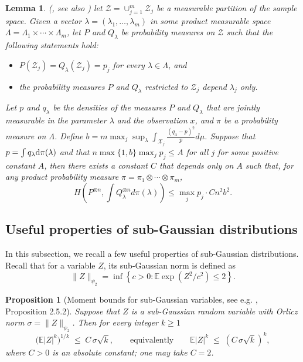 \documentclass{article}
\newcommand{\E}{\mathbb{E}}
\newcommand{\dd}{\textup{d}}
\newtheorem{lemma}{Lemma}[section]
\newtheorem{proposition}{Proposition}[section]
\begin{document}
\begin{lemma}
    \label{lemma:hellinger-bound-previous}
    (\citet[Theorem 2.1]{robins2009semiparametric}, see also \citet[Theorem 4]{jin2024structure})
    let $\mathcal{Z}=\cup_{j=1}^m \mathcal{Z}_j$ be a measurable partition of the sample space. Given a vector $\lambda=\left(\lambda_1, \ldots, \lambda_m\right)$ in some product measurable space $\Lambda=\Lambda_1 \times \cdots \times \Lambda_m$, let $P$ and $Q_{\lambda}$ be probability measures on $\mathcal{Z}$ such that the following statements hold:
    \begin{itemize}
        \item $P\left(\mathcal{Z}_j\right)=Q_\lambda\left(\mathcal{Z}_j\right)= p_j$ for every $\lambda \in \Lambda$, and
        \item the probability measures $P$ and $Q_{\lambda}$ restricted to $\mathcal{Z}_j$ depend $\lambda_j$ only.
    \end{itemize}
    
    Let $p$ and $q_{\lambda}$ be the densities of the measures $P$ and $Q_\lambda$ that are jointly measurable in the parameter $\lambda$ and the observation $x$, and $\pi$ be a probability measure on $\Lambda$. Define $b= m\max _j \sup _\lambda \int_{\mathcal{X}_j} \frac{\left(q_\lambda-p\right)^2}{p} d \mu$.
    Suppose that $p=\int q_{\lambda}\dd\pi(\lambda)$ and that $n\max\{1,b\}\max_j p_j \leq A$ for all $j$ for some positive constant $A$, then there exists a constant $C$ that depends only on $A$ such that, for any product probability measure $\pi=\pi_1 \otimes \cdots \otimes \pi_m$,
    $$
    H\left(P^{\otimes n}, \int Q_\lambda^{\otimes n} d \pi(\lambda)\right) \leq \max_j p_j\cdot Cn^2b^2.
    $$
\end{lemma}

\subsection{Useful properties of sub-Gaussian distributions}

In this subsection, we recall a few useful properties of sub-Gaussian distributions. Recall that for a variable $Z$, its sub-Gaussian norm is defined as
\begin{equation}
    \label{sub-gaussian-norm}
    \|Z\|_{\psi_2} = \inf \left\{ c>0 : \E\exp(Z^2/c^2) \leq 2\right\}.
\end{equation}

\begin{proposition}[Moment bounds for sub-Gaussian variables, see e.g. , \citet{vershynin2018high} Proposition 2.5.2]
    Suppose that $Z$ is a sub-Gaussian random variable with Orlicz norm 
    $\sigma=\|Z\|_{\psi_2}$.  Then for every integer $k\ge1$
    \[
        \bigl(\E|Z|^{k}\bigr)^{1/k}\;\le\;C\,\sigma\sqrt{k},
        \qquad\text{equivalently}\qquad
        \E|Z|^{k}\;\le\;(C\,\sigma\sqrt{k})^{k},
    \]
    where $C>0$ is an absolute constant; one may take $C=2$.
\end{proposition}
\end{document}
